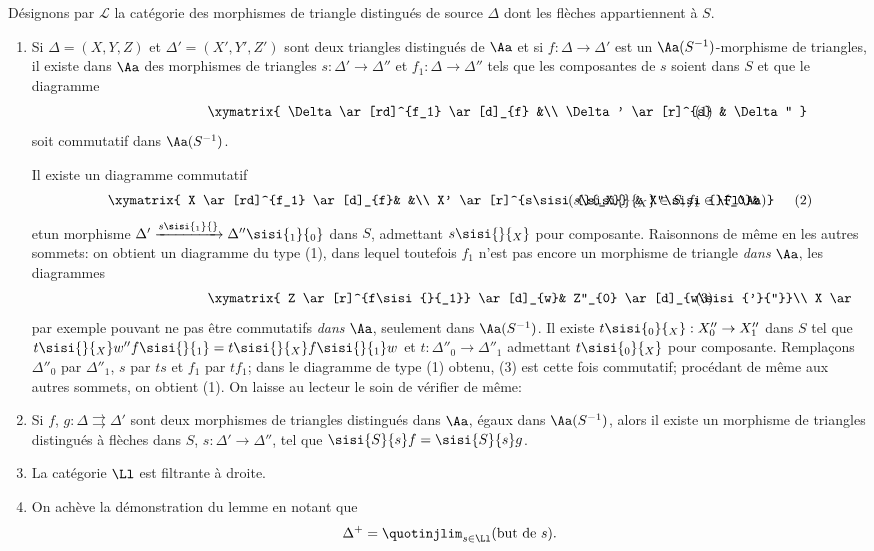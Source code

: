 \documentclass[10pt]{../fichiers-configuration-latex/smfart}
\begin{document}
Désignons par $\mathcal{L}$ la catégorie des morphismes de triangle
distingués de source $\Delta$ dont les flèches appartiennent à $S$.
\begin{enumerate}
\renewcommand{\theenumi}{\alph{enumi}}
\renewcommand{\labelenumi}{(\theenumi)}
\item Si $\Delta=(X,Y,Z)$ et $\Delta'=(X',Y',Z')$ sont deux triangles
distingués de $\Aa$ et si $f:\Delta\rightarrow \Delta'$ est un
$\Aa(S^{-1})$-morphisme de triangles, il existe dans
$\Aa$ des morphismes de triangles
$s:\Delta'\rightarrow\Delta''$ et $f_1:\Delta\rightarrow \Delta''$
tels que les composantes de $s$ soient dans $S$ et que le diagramme
\[
\vcenter{
\xymatrix{
\Delta                \ar[rd]^{f_1}  \ar[d]_{f}  &\\
\Delta'          \ar[r]^{s}    & \Delta''
}}\tag{1}
\]
soit commutatif dans $\Aa(S^{-1})$.

\sisi{\noindent}{}%
Il existe un diagramme commutatif
\[
\vcenter{
\xymatrix{
X \ar[rd]^{f_1} \ar[d]_{f}&  &\\
X' \ar[r]^{s\sisi{}{_X}} & X''\sisi{}{_0}&
}}(s\sisi{}{_X} \in S, f_1 \in \Fl \Aa)\tag{2}
\]
et\pageoriginale un morphisme $\Delta'\xrightarrow{s\sisi{_1}{}}\Delta''\sisi{_1}{_0}$
dans $S$, admettant $s\sisi{}{_X}$ pour composante. Raisonnons de même en les
autres sommets: on obtient un diagramme du type (1), dans lequel
toutefois $f_1$ n'est pas encore un morphisme de triangle \emph{dans}
$\Aa$, les diagrammes
\[
\vcenter{
\xymatrix{
Z  \ar[r]^{f\sisi{}{_1}} \ar[d]_{w}& Z''_{0} \ar[d]_{w\sisi{'}{''}}\\
X         \ar[r]^{f\sisi{}{_1}} & X''_{0}
}}\tag{3}
\]
par exemple pouvant ne pas être commutatifs \emph{dans} $\Aa$,
seulement dans $\Aa(S^{-1})$. Il existe
$t\sisi{_0}{_X}:X''_0\rightarrow X''_1$ dans $S$ tel que $t\sisi{}{_X}w''f\sisi{}{_1}=t\sisi{}{_X}f\sisi{}{_1}w$
et $t:\Delta''_0\rightarrow \Delta''_1$ admettant $t\sisi{_0}{_X}$
pour composante. Remplaçons $\Delta''_0$ par $\Delta''_1$,
$s$ par $ts$ et $f_1$ par $tf_1$; dans le diagramme de type (1)
obtenu, (3) est cette fois commutatif; procédant de même aux autres
sommets, on obtient (1). On laisse au lecteur le soin de vérifier de
même:

\item Si $f$, $g:\Delta\rightrightarrows \Delta'$ sont deux morphismes
de triangles distingués dans $\Aa$, égaux dans
$\Aa(S^{-1})$, alors il existe un morphisme de triangles
distingués à flèches dans $S$, $s:\Delta'\rightarrow \Delta''$, tel
que $\sisi{S}{s}f=\sisi{S}{s}g$.

\item La catégorie $\Ll$ est filtrante à droite.

\item On achève la démonstration du lemme en notant que
\[
\Delta^{+}=\quotinjlim_{s\in \Ll}{\mbox{\rm (but
de $s$).}}
\]
\end{enumerate}
\end{document}
